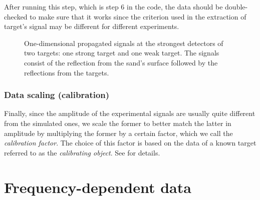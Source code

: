 \documentclass[a4paper,12pt]{article}
\begin{document}
After running this step, which is step 6 in the code, the data should be double-checked to make sure that it works since the criterion used in the extraction of target's signal may be different for different experiments. 



\begin{figure}[tph]
\centering
{} 
\caption{One-dimensional propagated signals at the strongest detectors of
two targets: one strong target and one weak target. 
The signals consist of the reflection from the sand's surface followed by the
reflections from the targets.}
\label{fig:4.3}
\end{figure}





\subsubsection{Data scaling (calibration)}
Finally, since the amplitude of
the experimental signals are usually quite different
from the simulated ones, we scale the former to better match the latter in amplitude by multiplying the former by a certain factor, which we call  the
\emph{calibration factor}. The choice of this factor is based on the data of a known
target referred to as the \textit{calibrating object}. See \cite{TBKF:SISC2014} for details. 



\section{Frequency-dependent data}





\end{document}
